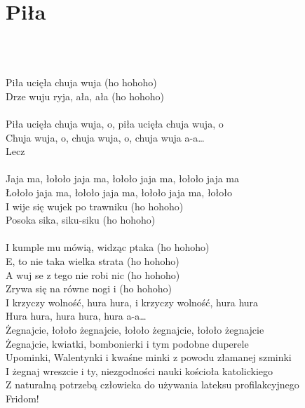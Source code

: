 \documentclass[a5paper, 10pt]{book}
\begin{document}
\section{Piła}\textcolor{lightgray}{\textit{}}\\~\\
\begin{minipage}[t]{0.85\textwidth}
  Piła ucięła chuja wuja (ho hohoho)\\
  Drze wuju ryja, ała, ała (ho hohoho)\\
  \\
  \hspace*{3mm}Piła ucięła chuja wuja, o, piła ucięła chuja wuja, o\\
  \hspace*{3mm}Chuja wuja, o, chuja wuja, o, chuja wuja a-a…\\
  \hspace*{3mm}Lecz\\
  \\
  \hspace*{6mm}Jaja ma, łołoło jaja ma, łołoło jaja ma, łołoło jaja ma\\
  \hspace*{6mm}Łołoło jaja ma, łołoło jaja ma, łołoło jaja ma, łołoło\\

  I wije się wujek po trawniku (ho hohoho)\\
  Posoka sika, siku-siku (ho hohoho)\\
  \\
  I kumple mu mówią, widząc ptaka (ho hohoho)\\
  E, to nie taka wielka strata (ho hohoho)\\

  A wuj se z tego nie robi nic (ho hohoho)\\
  Zrywa się na równe nogi i (ho hohoho)\\

  \hspace*{3mm}I krzyczy wolność, hura hura, i krzyczy wolność, hura hura\\
  \hspace*{3mm}Hura hura, hura hura, hura a-a…\\

  \hspace*{6mm}Żegnajcie, łołoło żegnajcie, łołoło żegnajcie, łołoło żegnajcie \\
  \hspace*{6mm}Żegnajcie, kwiatki, bombonierki i tym podobne duperele\\
  \hspace*{6mm}Upominki, Walentynki i kwaśne minki z powodu złamanej szminki\\
  \hspace*{6mm}I żegnaj wreszcie i ty, niezgodności nauki kościoła katolickiego\\
  \hspace*{6mm}Z naturalną potrzebą człowieka do używania lateksu profilakcyjnego\\
  \hspace*{6mm}Fridom!\\
\end{minipage}
\end{document}
